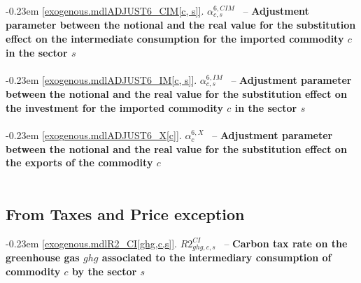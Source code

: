 \documentclass[12pt]{article}
\numberwithin{equation}{section}
\begin{document}
\noindent \kern-0.23em \noindent \begingroup {} \label{exogenous.mdlADJUST6_CIM[c, s]}\ref{exogenous.mdlADJUST6_CIM[c, s]}.
         
        \ensuremath{\alpha^{{6},CIM}_{c, s}}~ \endgroup -- \noindent \textbf{Adjustment parameter between the notional and the real value for the substitution effect on the intermediate consumption for the imported commodity $c$ in the sector $s$}  \\ \\[-8pt]


\noindent \kern-0.23em \noindent \begingroup {} \label{exogenous.mdlADJUST6_IM[c, s]}\ref{exogenous.mdlADJUST6_IM[c, s]}.
         
        \ensuremath{\alpha^{{6},IM}_{c, s}}~ \endgroup -- \noindent \textbf{Adjustment parameter between the notional and the real value for the substitution effect on the investment for the imported commodity $c$ in the sector $s$}  \\ \\[-8pt]


\noindent \kern-0.23em \noindent \begingroup {} \label{exogenous.mdlADJUST6_X[c]}\ref{exogenous.mdlADJUST6_X[c]}.
         
        \ensuremath{\alpha^{{6},X}_{c}}~ \endgroup -- \noindent \textbf{Adjustment parameter between the notional and the real value for the substitution effect on the exports of the commodity $c$}  \\ \\[-8pt]












\subsection{From Taxes and Price exception}




\noindent \kern-0.23em \noindent \begingroup {} \label{exogenous.mdlR2_CI[ghg,c,s]}\ref{exogenous.mdlR2_CI[ghg,c,s]}.
         
        \ensuremath{R2^{CI}_{ghg, c, s}}~ \endgroup -- \noindent \textbf{Carbon tax rate on the greenhouse gas $ghg$ associated to the intermediary consumption of commodity $c$ by the sector $s$}  \\ \\[-8pt]
\end{document}
